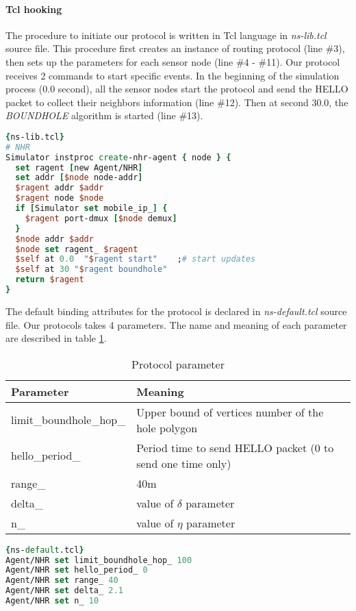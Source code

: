 \paragraph{Tcl hooking \\}
The procedure to initiate our protocol is written in Tcl language in \emph{ns-lib.tcl} source file. This procedure first creates an instance of routing protocol (line \#3), then sets up the parameters for each sensor node (line \#4 - \#11). Our protocol receives 2 commands to start specific events. In the beginning of the simulation process (0.0 second), all the sensor nodes start the protocol and send the HELLO packet to collect their neighbors information (line \#12). Then at second 30.0, the \emph{BOUNDHOLE} algorithm is started (line \#13).
\begin{lstlisting}[language=tcl]{ns-lib.tcl}
# NHR
Simulator instproc create-nhr-agent { node } {
  set ragent [new Agent/NHR]
  set addr [$node node-addr]
  $ragent addr $addr
  $ragent node $node
  if [Simulator set mobile_ip_] {
    $ragent port-dmux [$node demux]
  }
  $node addr $addr
  $node set ragent_ $ragent
  $self at 0.0  "$ragent start"    ;# start updates
  $self at 30 "$ragent boundhole"
  return $ragent
}
\end{lstlisting}

The default binding attributes for the protocol is declared in \emph{ns-default.tcl} source file. Our protocols takes 4 parameters. The name and meaning of each parameter are described in table \ref{table-param}.
\begin{table}[!htb]
\centering
\caption{Protocol parameter}
\label{table-param}
\begin{tabular}{|l|p{8cm}|}
\hline
Parameter               & Meaning                                                    \\ \hline
limit\_boundhole\_hop\_ & Upper bound of vertices number of the hole polygon         \\ \hline
hello\_period\_         & Period time to send HELLO packet (0 to send one time only) \\ \hline
range\_                 & 40m                                                        \\ \hline
delta\_                 & value of $\delta$ parameter                                \\ \hline
n\_                     & value of $\eta$ parameter                                  \\ \hline
\end{tabular}
\end{table}

\begin{lstlisting}[language=tcl]{ns-default.tcl}
Agent/NHR set limit_boundhole_hop_ 100
Agent/NHR set hello_period_ 0
Agent/NHR set range_ 40
Agent/NHR set delta_ 2.1
Agent/NHR set n_ 10
\end{lstlisting}